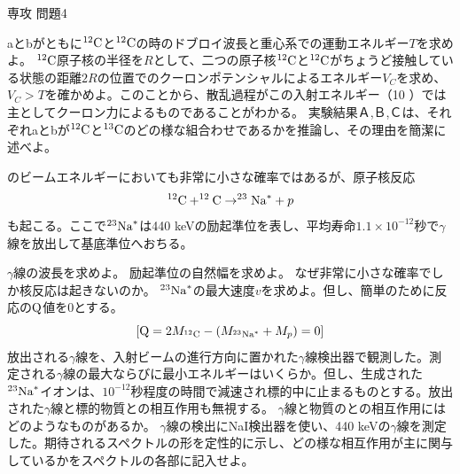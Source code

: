 \documentclass[fleqn]{jbook}
\begin{document}
\begin{question}{専攻 問題4}{}
\begin{subquestions}
\begin{subsubquestions}
\SubSubQuestion
aとbがともに$^{12}{\rm{C}}$と$^{12}{\rm{C}}$の時のドブロイ波長と重心系での運動エネルギー$T$を求めよ。
\SubSubQuestion
$^{12}{\rm{C}}$原子核の半径を$R$として、二つの原子核$^{12}{\rm{C}}$と$^{12}{\rm{C}}$がちょうど接触している状態の距離$2R$の位置でのクーロンポテンシャルによるエネルギー$V_C$を求め、$V_C>T$を確かめよ。このことから、散乱過程がこの入射エネルギー（10 {}）では主としてクーロン力によるものであることがわかる。
\SubSubQuestion
実験結果Ａ,Ｂ,Ｃは、それぞれaとbが$^{12}{\rm{C}}$と$^{13}{\rm{C}}$のどの様な組合わせであるかを推論し、その理由を簡潔に述べよ。
\end{subsubquestions}

のビームエネルギーにおいても非常に小さな確率ではあるが、原子核反応
\[ ^{12}{\rm{C}}+^{12}{\rm{C}}\rightarrow ^{23}{\rm{Na}}^{*}+p \]
も起こる。ここで$^{23}{\rm{Na}}^*$は440 keVの励起準位を表し、平均寿命$1.1\times 10^{-12}$秒で$\gamma$線を放出して基底準位へおちる。
\begin{subsubquestions}
\SubSubQuestion
$\gamma$線の波長を求めよ。
\SubSubQuestion
励起準位の自然幅を求めよ。
\SubSubQuestion
なぜ非常に小さな確率でしか核反応は起きないのか。
\SubSubQuestion
$^{23}{\rm{Na}}^*$の最大速度$v$を求めよ。但し、簡単のために反応の${\rm{Q}}$値を0とする。
\[ [ {\rm{Q}}=2M_{^{12}{\rm{C}}}-(M_{^{23}{\rm{Na}}^*}+M_p)=0 ] \]
\SubSubQuestion
放出される$\gamma$線を、入射ビームの進行方向に置かれた$\gamma$線検出器で観測した。測定される$\gamma$線の最大ならびに最小エネルギーはいくらか。但し、生成された$^{23}{\rm{Na}}^*$イオンは、$10^{-12}$秒程度の時間で減速され標的中に止まるものとする。放出された$\gamma$線と標的物質との相互作用も無視する。
\SubSubQuestion
$\gamma$線と物質のとの相互作用にはどのようなものがあるか。
\SubSubQuestion
$\gamma$線の検出にNaI検出器を使い、440 keVの$\gamma$線を測定した。期待されるスペクトルの形を定性的に示し、どの様な相互作用が主に関与しているかをスペクトルの各部に記入せよ。
\end{subsubquestions}
\end{subquestions}
\end{question}
\end{document}
